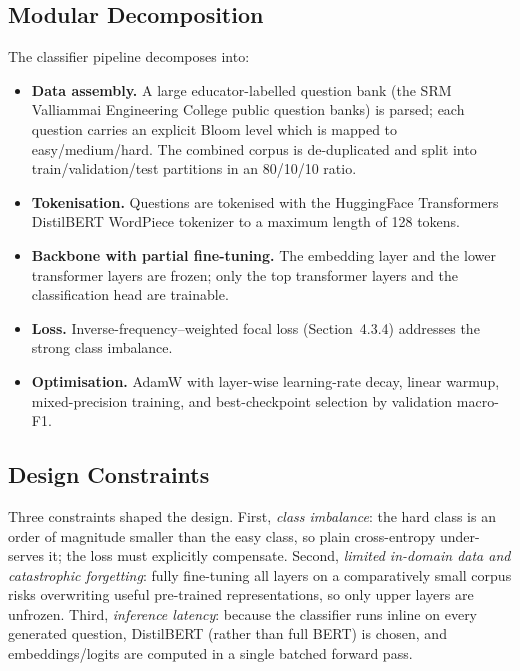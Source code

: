\documentclass[12pt,a4paper]{report}
\begin{document}
\subsection{Modular Decomposition}
The classifier pipeline decomposes into:
\begin{itemize}[leftmargin=*]
  \item \textbf{Data assembly.} A large educator-labelled question bank (the SRM
  Valliammai Engineering College public question banks) is parsed; each question
  carries an explicit Bloom level which is mapped to easy/medium/hard. The
  combined corpus is de-duplicated and split into train/validation/test
  partitions in an 80/10/10 ratio.
  \item \textbf{Tokenisation.} Questions are tokenised with the HuggingFace
  Transformers DistilBERT WordPiece tokenizer
  \parencite{wolf2020transformers} to a maximum length of 128 tokens.
  \item \textbf{Backbone with partial fine-tuning.} The embedding layer and the
  lower transformer layers are frozen; only the top transformer layers and the
  classification head are trainable.
  \item \textbf{Loss.} Inverse-frequency--weighted focal loss
  (Section~4.3.4) addresses the strong class imbalance.
  \item \textbf{Optimisation.} AdamW with layer-wise learning-rate decay, linear
  warmup, mixed-precision training, and best-checkpoint selection by validation
  macro-F1.
\end{itemize}

\subsection{Design Constraints}
Three constraints shaped the design. First, \emph{class imbalance}: the hard
class is an order of magnitude smaller than the easy class, so plain
cross-entropy under-serves it; the loss must explicitly compensate. Second,
\emph{limited in-domain data and catastrophic forgetting}: fully fine-tuning all
layers on a comparatively small corpus risks overwriting useful pre-trained
representations, so only upper layers are unfrozen. Third, \emph{inference
latency}: because the classifier runs inline on every generated question,
DistilBERT (rather than full BERT) is chosen, and embeddings/logits are computed
in a single batched forward pass.
\end{document}
